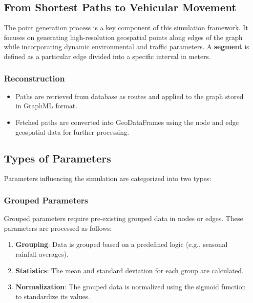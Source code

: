 \documentclass[sigplan,screen]{acmart}
\begin{document}
\subsection{From Shortest Paths to Vehicular Movement}
The point generation process is a key component of this simulation framework. 
It focuses on generating high-resolution geospatial points along edges of 
the graph while incorporating dynamic environmental and traffic parameters. 
A \textbf{segment} is defined as a particular edge divided into a specific 
interval in meters.

\newpage


\vspace{2cm}

\subsubsection{Reconstruction}
\begin{itemize}
    \item Paths are retrieved from database as routes and applied to the graph stored in GraphML format.
    \item Fetched paths are converted into GeoDataFrames using the node and edge geospatial data for further processing.
\end{itemize}

\subsection{Types of Parameters}
Parameters influencing the simulation are categorized into two types:

\subsubsection{Grouped Parameters}
Grouped parameters require pre-existing grouped data in nodes or edges. These parameters are processed as follows:

\begin{enumerate}
    \item \textbf{Grouping}: Data is grouped based on a predefined logic (e.g., seasonal rainfall averages).
    \item \textbf{Statistics}: The mean and standard deviation for each group are calculated.
    \item \textbf{Normalization}: The grouped data is normalized using the sigmoid function to standardize its values.
\end{enumerate}
\end{document}
